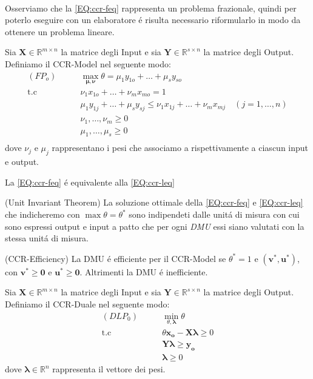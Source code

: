 \paragraph{}
Osserviamo che la \ref{EQ:ccr-feq} rappresenta un problema frazionale, quindi per poterlo eseguire con un elaboratore \'e risulta necessario riformularlo in modo da ottenere un problema lineare. 
\begin{definiz}
 Sia $\boldsymbol{X} \in \mathbb{R}^{m \times n}$ la matrice degli Input e sia $\boldsymbol{Y} \in \mathbb{R}^{s \times n}$  la matrice degli Output. Definiamo il CCR-Model nel seguente modo:
\begin{equation} \label{EQ:ccr-leq}
\begin{split}
(FP_o) \qquad & \max_{\boldsymbol{\mu,\nu}} \theta = \mu_1y_{1o} + \dots + \mu_sy_{so} \\
\text{t.c} \qquad & \nu_1x_{1o} + \dots + \nu_mx_{mo} = 1\\
& \mu_1y_{1j} + \dots + \mu_sy_{sj} \leq  \nu_1x_{1j} + \dots + \nu_mx_{mj} \quad (j = 1, \dots, n) \\
& \nu_1,\dots,\nu_m \geq 0 \\
& \mu_1,\dots,\mu_s \geq 0 \\
\end{split}
\end{equation}
dove $\nu_j$ e $\mu_j$ rappresentano i pesi che associamo a rispettivamente a ciascun input e output.
\end{definiz}
\begin{teor}
La \ref{EQ:ccr-feq} \'e equivalente alla \ref{EQ:ccr-leq}
\end{teor}
\begin{teor}(Unit Invariant Theorem)
La soluzione ottimale della \ref{EQ:ccr-feq} e \ref{EQ:ccr-leq} che indicheremo con $\max \theta = \theta^*$ sono indipendeti dalle unit\'a di misura con cui sono espressi output e input a patto che per ogni \emph{DMU} essi siano valutati con la stessa unit\'a di misura.
\end{teor}
\begin{definiz} (CCR-Efficiency) La DMU \'e efficiente per il CCR-Model se $\theta^* = 1$ e $(\boldsymbol{v^*, u^*})$, con $\boldsymbol{v^* \geq 0}$ e $\boldsymbol{u^* \geq 0}$. Altrimenti la DMU \'e inefficiente.
\end{definiz} 
\begin{definiz} Sia $\boldsymbol{X} \in \mathbb{R}^{m \times n}$ la matrice degli Input e sia $\boldsymbol{Y} \in \mathbb{R}^{s \times n}$  la matrice degli Output. Definiamo il CCR-Duale nel seguente modo:
\begin{equation}
\begin{split}
(DLP_0) \qquad & \min_{\theta, \boldsymbol{\lambda}} \theta \\
\text{t.c} \qquad & \theta\boldsymbol{x_o} - \boldsymbol{X\lambda} \geq 0 \\
& \boldsymbol{Y\lambda} \geq \boldsymbol{y_o} \\
& \boldsymbol{\lambda} \geq 0
\end{split}
\end{equation}
dove $\boldsymbol{\lambda} \in \mathbb{R}^{n}$ rappresenta il vettore dei pesi.
\end{definiz}
